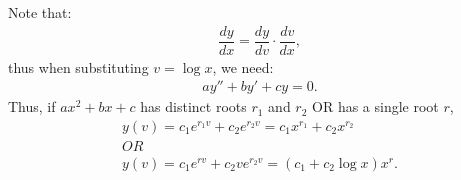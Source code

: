 \documentclass[11pt]{article}
\begin{document}
    \begin{solution}
        Note that:
        \begin{align}
            \dfrac{dy}{dx} = \dfrac{dy}{dv} \cdot \dfrac{dv}{dx},
        \end{align}
        thus when substituting $v = \log x$, we need:
        \begin{align}
            ay'' + by' + cy = 0.
        \end{align}
        Thus, if $ax^2 + bx + c$ has distinct roots $r_1$ and $r_2$ OR has a single root $r$,
        \begin{align}
            y(v) = c_1e^{r_1v} + c_2e^{r_2v} = c_1x^{r_1} + c_2x^{r_2} \\
            OR \\ 
            y(v) = c_1e^{rv} + c_2ve^{r_2v} = (c_1+c_2 \log x)x^{r}.
        \end{align}
    \end{solution}
\end{document}
